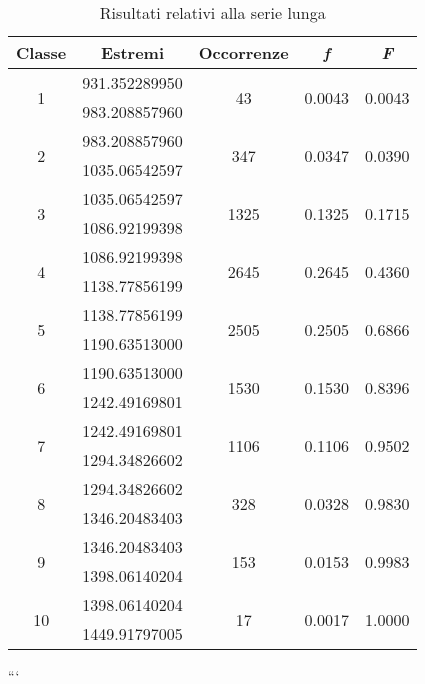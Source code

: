 \begin{table}[H]
	\centering
	\begin{tabular}{c|c|c|c|c}
		\toprule
		\toprule
		\textbf{Classe} & \textbf{Estremi} & \textbf{Occorrenze} & \textbf{\textit{f}} & \textbf{\textit{F}} \\
		\midrule
		\midrule
		\multirow{2}{*}{1} & 931.352289950& \multirow{2}{*}{43} & \multirow{2}{*}{0.0043} & \multirow{2}{*}{0.0043} \\
		& 983.208857960& & & \\
		\midrule
		\multirow{2}{*}{2} & 983.208857960 & \multirow{2}{*}{347} & \multirow{2}{*}{0.0347} & \multirow{2}{*}{0.0390} \\
		& 1035.06542597 & & & \\
		\midrule
		\multirow{2}{*}{3} &1035.06542597 & \multirow{2}{*}{1325} & \multirow{2}{*}{0.1325} & \multirow{2}{*}{0.1715} \\
		& 1086.92199398 & & & \\
		\midrule
		\multirow{2}{*}{4} & 1086.92199398 & \multirow{2}{*}{2645} & \multirow{2}{*}{0.2645} & \multirow{2}{*}{0.4360} \\
		& 1138.77856199 & & & \\
		\midrule
		\multirow{2}{*}{5} & 1138.77856199 & \multirow{2}{*}{2505} & \multirow{2}{*}{0.2505} & \multirow{2}{*}{0.6866} \\
		& 1190.63513000 & & & \\
		\midrule
		\multirow{2}{*}{6} & 1190.63513000 & \multirow{2}{*}{1530} & \multirow{2}{*}{0.1530} & \multirow{2}{*}{0.8396} \\
		& 1242.49169801 & & & \\
		\midrule
		\multirow{2}{*}{7} &1242.49169801 & \multirow{2}{*}{1106} & \multirow{2}{*}{0.1106} & \multirow{2}{*}{0.9502} \\
		& 1294.34826602 & & & \\
		\midrule
		\multirow{2}{*}{8} &1294.34826602 & \multirow{2}{*}{328} & \multirow{2}{*}{0.0328} & \multirow{2}{*}{0.9830} \\
		& 1346.20483403 & & & \\
		\midrule
		\multirow{2}{*}{9} &1346.20483403 & \multirow{2}{*}{153} & \multirow{2}{*}{0.0153} & \multirow{2}{*}{0.9983} \\
		&1398.06140204 & & & \\
		\midrule
		\multirow{2}{*}{10} &1398.06140204& \multirow{2}{*}{17} & \multirow{2}{*}{0.0017} & \multirow{2}{*}{1.0000} \\
		& 1449.91797005 & & & \\
		\bottomrule
		\bottomrule
	\end{tabular}
	\caption{Risultati relativi alla serie lunga}
	\label{tab:serielunga}
\end{table}
```